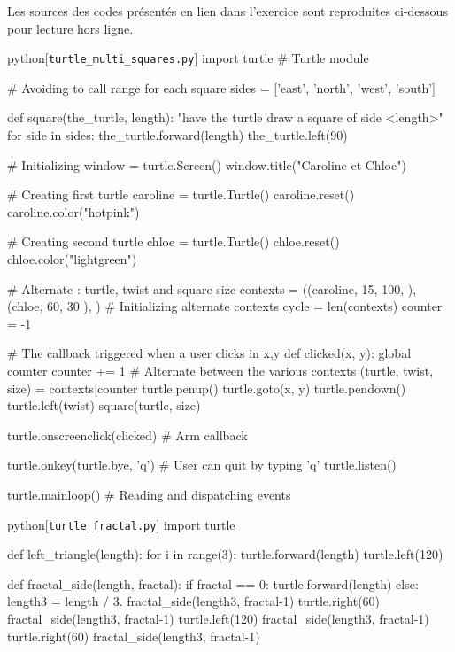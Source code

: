 \begin{solution}[ID=4]
Les sources des codes présentés en lien dans l'exercice sont reproduites ci-dessous pour lecture hors ligne.

\begin{listing}{python}[\texttt{turtle\_multi\_squares.py}]
import turtle # Turtle module

# Avoiding to call range for each square
sides = ['east', 'north', 'west', 'south']

def square(the_turtle, length):
    "have the turtle draw a square of side <length>"
    for side in sides:
        the_turtle.forward(length)
        the_turtle.left(90)

# Initializing
window = turtle.Screen()
window.title("Caroline et Chloe")

# Creating first turtle
caroline = turtle.Turtle()
caroline.reset()
caroline.color("hotpink")

# Creating second turtle
chloe = turtle.Turtle()
chloe.reset()
chloe.color("lightgreen")

# Alternate : turtle, twist and square size
contexts = ((caroline, 15, 100, ),
            (chloe, 60, 30 ),
           )
# Initializing alternate contexts
cycle = len(contexts)
counter = -1

# The callback triggered when a user clicks in x,y
def clicked(x, y):
    global counter
    counter += 1
    # Alternate between the various contexts
    (turtle, twist, size) = contexts[counter %
    turtle.penup()
    turtle.goto(x, y)
    turtle.pendown()
    turtle.left(twist)
    square(turtle, size)

turtle.onscreenclick(clicked) # Arm callback

turtle.onkey(turtle.bye, 'q') # User can quit by typing 'q'
turtle.listen()

turtle.mainloop() # Reading and dispatching events
\end{listing}

\begin{listing}{python}[\texttt{turtle\_fractal.py}]
import turtle

def left_triangle(length):
    for i in range(3):
        turtle.forward(length)
        turtle.left(120)

def fractal_side(length, fractal):
    if fractal == 0:
        turtle.forward(length)
    else:
        length3 = length / 3.
        fractal_side(length3, fractal-1)
        turtle.right(60)
        fractal_side(length3, fractal-1)
        turtle.left(120)
        fractal_side(length3, fractal-1)
        turtle.right(60)
        fractal_side(length3, fractal-1)


\end{listing}
\end{solution}
